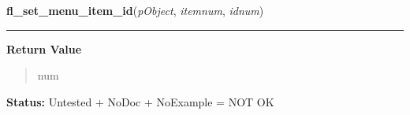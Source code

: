     \label{xformslib:library:fl_set_menu_item_id}

    \vspace{0.5ex}

\hspace{.8\funcindent}\begin{boxedminipage}{\funcwidth}

    \raggedright \textbf{fl\_set\_menu\_item\_id}(\textit{pObject}, \textit{itemnum}, \textit{idnum})

    \vspace{-1.5ex}

    \rule{\textwidth}{0.5\fboxrule}
\setlength{\parskip}{2ex}
\setlength{\parskip}{1ex}
      \textbf{Return Value}
    \vspace{-1ex}

      \begin{quote}
      num

      \end{quote}

\textbf{Status:} Untested + NoDoc + NoExample = NOT OK



    \end{boxedminipage}

    \label{xformslib:library:fl_create_nmenu}

    \vspace{0.5ex}

